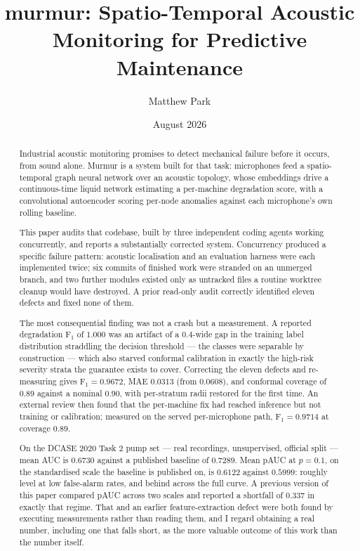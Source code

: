 \documentclass[11pt]{article}
\title{\textbf{murmur: Spatio-Temporal Acoustic Monitoring for Predictive
Maintenance}}
\author{Matthew Park}
\date{August 2026}
\begin{document}
\maketitle

\begin{abstract}
\noindent
Industrial acoustic monitoring promises to detect mechanical failure before it
occurs, from sound alone. Murmur is a system built for that task: microphones
feed a spatio-temporal graph neural network over an acoustic topology, whose
embeddings drive a continuous-time liquid network estimating a per-machine
degradation score, with a convolutional autoencoder scoring per-node anomalies
against each microphone's own rolling baseline.

This paper audits that codebase, built by three independent coding agents
working concurrently, and reports a substantially corrected system.
Concurrency produced a specific failure pattern: acoustic localisation and an
evaluation harness were each implemented twice; six commits of finished work
were stranded on an unmerged branch, and two further modules existed only as
untracked files a routine worktree cleanup would have destroyed. A prior
read-only audit correctly identified eleven defects and fixed none of them.

The most consequential finding was not a crash but a measurement. A reported
degradation $\mathrm{F}_1$ of $1.000$ was an artifact of a $0.4$-wide gap
in the training label distribution straddling the decision threshold --- the
classes were separable by construction --- which also starved conformal
calibration in exactly the high-risk severity strata the guarantee exists to
cover. Correcting the eleven defects and re-measuring gives $\mathrm{F}_1 =
0.9672$, MAE $0.0313$ (from $0.0608$), and conformal coverage of $0.89$ against
a nominal $0.90$, with per-stratum radii restored for the first time. An
external review then found that the per-machine fix had reached inference but
not training or calibration; measured on the served per-microphone path,
$\mathrm{F}_1 = 0.9714$ at coverage $0.89$.

On the DCASE 2020 Task 2 pump set --- real recordings, unsupervised, official
split --- mean AUC is $0.6730$ against a published baseline of $0.7289$. Mean
pAUC at $p{=}0.1$, on the standardised scale the baseline is published on, is
$0.6122$ against $0.5999$: roughly level at low false-alarm rates, and behind
across the full curve. A previous version of this paper compared pAUC across
two scales and reported a shortfall of $0.337$ in exactly that regime. That and
an earlier feature-extraction defect were both found by executing measurements
rather than reading them, and I regard obtaining a real number, including one
that falls short, as the more valuable outcome of this work than the number
itself.
\end{abstract}
\end{document}
